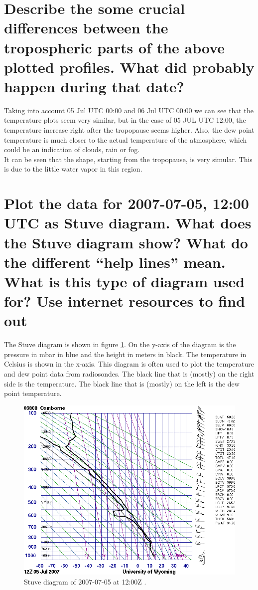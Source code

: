\documentclass{article}
\begin{document}
\section{Describe the some crucial differences between the tropospheric parts of the above plotted profiles. What did probably happen during that date?}

 Taking into account 05 Jul UTC 00:00  and 06 Jul UTC 00:00 we can see that the temperature plots seem very similar, but in the case of 05 JUL UTC 12:00, the temperature increase right after the tropopause seems higher. Also, the dew point temperature is much closer to the actual temperature of the atmosphere, which could be an indication of clouds, rain or fog.\\
 
 It can be seen that the shape, starting from the tropopause, is very simular. This is due to the little water vapor in this region.



\newpage
\section{Plot the data for 2007-07-05, 12:00 UTC as Stuve diagram. What does the Stuve diagram show? What do the different “help lines” mean. What is this type of diagram used for? Use internet resources to find out}
The Stuve diagram is shown in figure \ref{fig:Q7}. On the y-axis of the diagram is the pressure in mbar in blue and the height in meters in black. The temperature in Celsius is shown in the x-axis. This diagram is often used to plot the temperature and dew point data from radiosondes. The black line that is (mostly) on the right side is the temperature. The black line that is (mostly) on the left is the dew point temperature.\\

\begin{figure}[H]
	\centering
	\includegraphics[width=.8\textwidth]{figures/stuve.png}
	\caption{Stuve diagram of 2007-07-05 at 12:00Z \cite{assignment}.}
	\label{fig:Q7}
\end{figure}
\end{document}
